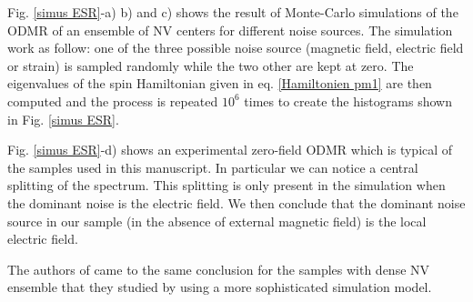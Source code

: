 \documentclass[a4paper, 11pt]{report}
\begin{document}
%

Fig. \ref{simus ESR}-a) b) and c) shows the result of Monte-Carlo simulations of the ODMR of an ensemble of NV centers for different noise sources. The simulation work as follow: one of the three possible noise source (magnetic field, electric field or strain) is sampled randomly while the two other are kept at zero. The eigenvalues of the spin Hamiltonian given in eq. \ref{Hamiltonien pm1} are then computed and the process is repeated $10^6$ times to create the histograms shown in Fig. \ref{simus ESR}.

Fig. \ref{simus ESR}-d) shows an experimental zero-field ODMR which is typical of the samples used in this manuscript. In particular we can notice a central splitting of the spectrum. This splitting is only present in the simulation when the dominant noise is the electric field. We then conclude that the dominant noise source in our sample (in the absence of external magnetic field) is the local electric field.

The authors of \citep{mittiga2018imaging} came to the same conclusion for the samples with dense NV ensemble that they studied by using a more sophisticated simulation model.

\end{document}
